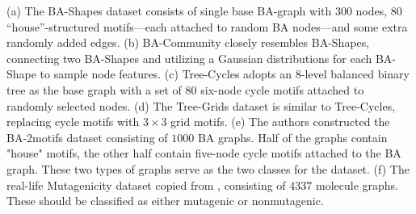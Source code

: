 (a) The BA-Shapes dataset consists of single base BA-graph with 300 nodes, 80 “house”-structured motifs---each attached to random BA nodes---and some extra randomly added edges. (b) BA-Community closely resembles BA-Shapes, connecting two BA-Shapes and utilizing a Gaussian distributions for each BA-Shape to sample node features. (c) Tree-Cycles adopts an $8$-level balanced binary tree as the base graph with a set of $80$ six-node cycle motifs attached to randomly selected nodes. (d) The Tree-Grids dataset is similar to Tree-Cycles, replacing cycle motifs with $3\times 3$ grid motifs. (e) The authors constructed the BA-2motifs dataset consisting of $1000$ BA graphs. Half of the graphs contain "house" motifs, the other half contain five-node cycle motifs attached to the BA graph. These two types of graphs serve as the two classes for the dataset. (f) The real-life Mutagenicity dataset copied from \cite{ying2019gnnexplainer}, consisting of $4337$ molecule graphs. These should be classified as either mutagenic or nonmutagenic.




